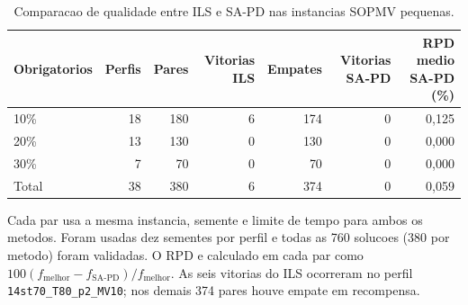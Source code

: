 \begin{table}[htbp]
\centering
\caption{Comparacao de qualidade entre ILS e SA-PD nas instancias SOPMV pequenas.}
\label{tab:ils-sapd-sopmv-small}
\begin{tabular}{lrrrrrr}
\toprule
Obrigatorios & Perfis & Pares & Vitorias ILS & Empates & Vitorias SA-PD & RPD medio SA-PD (\%) \\
\midrule
10\% & 18 & 180 & 6 & 174 & 0 & 0{,}125 \\
20\% & 13 & 130 & 0 & 130 & 0 & 0{,}000 \\
30\% & 7  & 70  & 0 & 70  & 0 & 0{,}000 \\
\midrule
Total & 38 & 380 & 6 & 374 & 0 & 0{,}059 \\
\bottomrule
\end{tabular}
\begin{minipage}{0.94\linewidth}\footnotesize
Cada par usa a mesma instancia, semente e limite de tempo para ambos os metodos.
Foram usadas dez sementes por perfil e todas as 760 solucoes (380 por metodo)
foram validadas. O RPD e calculado em cada par como
$100(f_{\mathrm{melhor}}-f_{\mathrm{SA\mbox{-}PD}})/f_{\mathrm{melhor}}$.
As seis vitorias do ILS ocorreram no perfil \texttt{14st70\_T80\_p2\_MV10};
nos demais 374 pares houve empate em recompensa.
\end{minipage}
\end{table}
